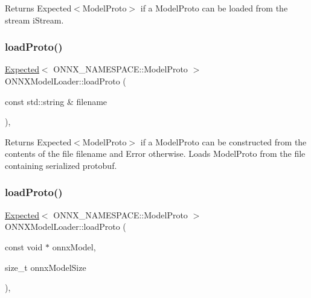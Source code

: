 \begin{DoxyReturn}{Returns}
Expected$<$\+Model\+Proto$>$ if a Model\+Proto can be loaded from the stream {\ttfamily i\+Stream}. 
\end{DoxyReturn}
\mbox{\label{classglow_1_1_o_n_n_x_model_loader_a5895f6457fc8173369cee2fd296c770d}} 
\subsubsection{\texorpdfstring{load\+Proto()}{loadProto()}\hspace{0.1cm}{\footnotesize\ttfamily [2/3]}}
{\footnotesize\ttfamily \hyperlink{classglow_1_1detail_1_1_glow_expected}{Expected}$<$ O\+N\+N\+X\+\_\+\+N\+A\+M\+E\+S\+P\+A\+C\+E\+::\+Model\+Proto $>$ O\+N\+N\+X\+Model\+Loader\+::load\+Proto (\begin{DoxyParamCaption}\item[{const std\+::string \&}]{filename }\end{DoxyParamCaption})\hspace{0.3cm}{\ttfamily [static]}, {\ttfamily [protected]}}

\begin{DoxyReturn}{Returns}
Expected$<$\+Model\+Proto$>$ if a Model\+Proto can be constructed from the contents of the file {\ttfamily filename} and Error otherwise. Loads Model\+Proto from the file containing serialized protobuf. 
\end{DoxyReturn}
\mbox{\label{classglow_1_1_o_n_n_x_model_loader_a014184395bf683b1873bb17eae365ebd}} 
\subsubsection{\texorpdfstring{load\+Proto()}{loadProto()}\hspace{0.1cm}{\footnotesize\ttfamily [3/3]}}
{\footnotesize\ttfamily \hyperlink{classglow_1_1detail_1_1_glow_expected}{Expected}$<$ O\+N\+N\+X\+\_\+\+N\+A\+M\+E\+S\+P\+A\+C\+E\+::\+Model\+Proto $>$ O\+N\+N\+X\+Model\+Loader\+::load\+Proto (\begin{DoxyParamCaption}\item[{const void $\ast$}]{onnx\+Model,  }\item[{size\+\_\+t}]{onnx\+Model\+Size }\end{DoxyParamCaption})\hspace{0.3cm}{\ttfamily [static]}, {\ttfamily [protected]}}

